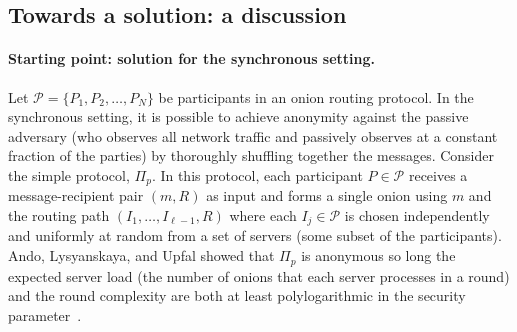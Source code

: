 \documentclass[runningheads,a4paper]{llncs}
\begin{document}








\subsection{Towards a solution: a discussion} \label{sec:contribitions}

\paragraph{Starting point: solution for the synchronous setting.}   Let $\mathcal{P} = \{P_1, P_2, \dots, P_N\}$ be  participants in an onion routing protocol.
In the synchronous setting, it is possible to achieve anonymity against the passive adversary (who observes all network traffic and passively observes at a constant fraction of the parties) by thoroughly shuffling together the messages. Consider the simple protocol, $\Pi_p$. In this protocol, each participant $P\in \mathcal{P}$ receives a message-recipient pair $(m, R)$ as input and forms a single onion using $m$ and the routing path $(I_1, \dots, I_{\ell-1}, R)$ where each $I_j\in \mathcal{P}$ is chosen independently and uniformly at random from a set of servers (some subset of the participants). Ando, Lysyanskaya, and Upfal showed that $\Pi_p$ is anonymous so long the expected server load (the number of onions that each server processes in a round) and the round complexity are both at least polylogarithmic in the security parameter~\cite{ICALP:AndLysUpf18}. 
\end{document}
